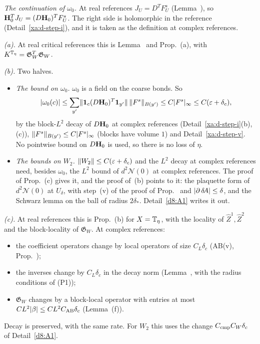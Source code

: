 \begin{detail}\label{xa:d-hessian}
\emph{The continuation of $\omega_0$.} At real references $J_U=D^TF^s_U$ (Lemma~), so $\mathbf H_0^TJ_U=(D\mathbf H_0)^TF^s_U$. The right side is holomorphic in the reference (Detail~\ref{xa:d-step-i}), and it is taken as the definition at complex references.

\emph{(a).} At real critical references this is Lemma~ and Prop.~(a), with $K^{\mathbb T_\eta}=\mathfrak G_W^T\mathfrak G_W$.

\emph{(b).} Two halves.
\begin{itemize}
\item \emph{The bound on $\omega_0$.} $\omega_0$ is a field on the coarse bonds. So
\[
\lvert\omega_0(c)\rvert\le\sum_{y'}\lVert\mathbf 1_c(D\mathbf H_0)^T\mathbf 1_{y'}\rVert\,\lVert F^s\rVert_{B(y')}\le C\lvert F^s\rvert_\infty\le C(\varepsilon+\delta_c),
\]
by the block-$L^2$ decay of $D\mathbf H_0$ at complex references (Detail~\ref{xa:d-step-i}(b),(c)), $\lVert F^s\rVert_{B(y')}\le C\lvert F^s\rvert_\infty$ (blocks have volume $1$) and Detail~\ref{xa:d-step-v}. No pointwise bound on $D\mathbf H_0$ is used, so there is no loss of $\eta$.
\item \emph{The bounds on $W_2$.} $\lVert W_2\rVert\le C(\varepsilon+\delta_c)$ and the $L^2$ decay at complex references need, besides $\omega_0$, the $L^2$ bound of $d^2\mathcal N(0)$ at complex references. The proof of Prop.~(c) gives it, and the proof of~(b) points to it: the plaquette form of $d^2\mathcal N(0)$ at $U_\delta$, with step~(v) of the proof of Prop.~ and $\lvert\partial\,\delta\!A\rvert\le\delta$, and the Schwarz lemma on the ball of radius $2\delta_*$. Detail~\ref{d8:A1} writes it out.
\end{itemize}

\emph{(c).} At real references this is Prop.~(b) for $X=\mathbb T_\eta$, with the locality of $\hat Z^1,\hat Z^2$ and the block-locality of $\mathfrak G_W$. At complex references:
\begin{itemize}
\item the coefficient operators change by local operators of size $C_L\delta_c$ (AB(v), Prop.~);
\item the inverses change by $C_L\delta_c$ in the decay norm (Lemma~, with the radius conditions of (P1));
\item $\mathfrak G_W$ changes by a block-local operator with entries at most $CL^2\lvert\beta\rvert\le CL^2C_{\rm AB}\delta_c$ (Lemma~(f)).
\end{itemize}
Decay is preserved, with the same rate. For $W_2$ this uses the change $C_{\rm cmp}C_W\delta_c$ of Detail~\ref{d8:A1}.


\end{detail}
